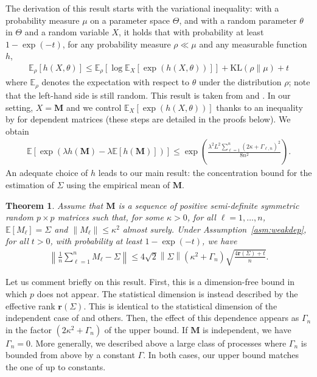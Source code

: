 \documentclass[11pt,a4paper]{article}
\newtheorem{theorem}{Theorem}%
\theoremstyle{remark}
\theoremstyle{definition}
\theoremstyle{definition}
\newcommand{\Ep}{\mathbb{E}}
\newcommand{\rc}{\color{black}}
\begin{document}
\begin{bibunit}[apalike]
The derivation of this result starts with the variational inequality: with a probability measure $\mu$ on a parameter space $\Theta$,
and with a random parameter $\theta$ in $\Theta$ and a random variable $X$, 
it holds that with probability at least $1-\exp(-t)$, for any probability measure $\rho\ll \mu$ and any measurable function $h$,
\begin{align*}
    \Ep_{\rho}[h\left(X,\theta\right)]\le \Ep_{\rho}\left[\log\Ep_{X}\left[\exp\left(h\left(X,\theta\right)\right)\right]\right]+ \mathrm{KL}\left(\rho \| \mu\right)+t
\end{align*}
where $ \Ep_{\rho}$ denotes the expectation with respect to $\theta$ under the distribution $\rho${\rc; note that the left-hand side is still random}.
This result is taken from \citep{catoni2017dimension} and \citep{zhivotovskiy2021dimension}.
In our setting, $X=\mathbf{M}$ and we control $\Ep_{X}\left[\exp\left(h\left(X,\theta\right)\right)\right]$ thanks to an inequality by \citep{rio2000inegalites} for dependent matrices (these steps are detailed in the proofs below). We obtain 
\begin{align*}
    \mathbb{E} \left[ \exp\left( \lambda h(\mathbf{M})- \lambda \mathbb{E}[h(\mathbf{M})] \right) \right]
    \leq \exp\left(\frac{\lambda^2 L^2 \sum_{\ell=1}^n \left( 2\kappa + \Gamma_{\ell,n} \right)^2 }{8 n^2}\right).  
\end{align*}
An adequate choice of $h$ leads to our main result: the concentration bound for the estimation of $\Sigma$ using the empirical mean of $\mathbf{M}$.
\begin{theorem} \label{thm:main}
Assume that $\mathbf{M}$ is a sequence of positive semi-definite symmetric random $p \times p$ matrices such that, for some $\kappa>0$, for all $\ell=1,\ldots,n$, $\Ep\left[M_{\ell}\right]=\Sigma$ and $\left\|M_{\ell}\right\|\le \kappa^{2}$ almost surely.
Under Assumption~\ref{asm:weakdep}, for all $t>0$, with probability at least $1-\exp(-t)$, we have
\begin{align*}
    \left\|\frac{1}{n}\sum_{\ell=1}^{n} M_{\ell}-\Sigma\right\|\le{4}\sqrt{2}\left\|\Sigma\right\|\left({ \kappa^{2}+\Gamma_{n}}\right)\sqrt{\frac{4\mathbf{r}\left(\Sigma\right)+t}{n}}.
\end{align*}
\end{theorem}
Let us comment briefly on this result.
First, this is a dimension-free bound in which $p$ does not appear. The statistical dimension is instead described by the effective rank $\mathbf{r}\left(\Sigma\right)$. 
This is identical to the statistical dimension of the independent case of \citep{koltchinskii2017concentration} and others.
Then, the effect of this dependence appears as $\Gamma_{n}$ in the factor $(2\kappa^{2}+\Gamma_{n})$ of the upper bound. 
If $\mathbf{M}$ is independent, we have $\Gamma_{n} = 0$. More generally, we described above a large class of processes where  $\Gamma_n$ is {\rc bounded from above by} a constant $\Gamma$. In both cases, our upper bound matches the one of \citep{koltchinskii2017concentration} up to constants.


\end{bibunit}
\end{document}
